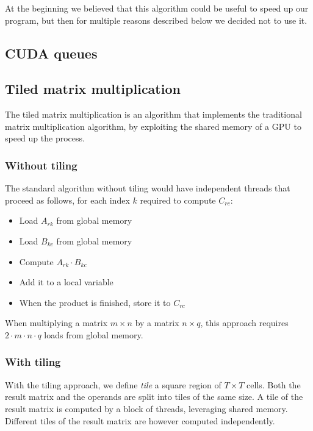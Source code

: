 At the beginning we believed that this algorithm could be useful to speed up our program, but then for multiple reasons described below we decided not to use it.

\subsection{CUDA queues}

\subsection{Tiled matrix multiplication}

The tiled matrix multiplication is an algorithm that implements the traditional matrix multiplication algorithm, by exploiting the shared memory of a GPU to speed up the process.

\subsubsection{Without tiling}

The standard algorithm without tiling would have independent threads that proceed as follows, for each index $k$ required to compute $C_{rc}$:
\begin{itemize}
	\itemsep 0em
	\item Load $A_{rk}$ from global memory
	\item Load $B_{kc}$ from global memory
	\item Compute $A_{rk} \cdot B_{kc}$
	\item Add it to a local variable
	\item When the product is finished, store it to $C_{rc}$
\end{itemize}

When multiplying a matrix $m \times n$ by a matrix $n \times q$, this approach requires $2 \cdot m \cdot n \cdot q$ loads from global memory.

\subsubsection{With tiling}

With the tiling approach, we define \textit{tile} a square region of $T \times T$ cells.
Both the result matrix and the operands are split into tiles of the same size.
A tile of the result matrix is computed by a block of threads, leveraging shared memory.
Different tiles of the result matrix are however computed independently.

